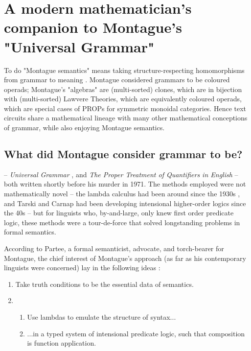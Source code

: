 \section{A modern mathematician's companion to Montague's "Universal Grammar"}\label{sec:monty}

 To do "Montague semantics" means taking structure-respecting homomorphisms from grammar to meaning \citep{janssen_montague_2021}. Montague considered grammars to be coloured operads; Montague's "algebras" are (multi-sorted) clones, which are in bijection with (multi-sorted) Lawvere Theories, which are equivalently coloured operads, which are special cases of PROPs for symmetric monoidal categories. Hence text circuits share a mathematical lineage with many other mathematical conceptions of grammar, while also enjoying Montague semantics.

\subsection{What did Montague consider grammar to be?}\label{sec:monty}

 -- \emph{Universal Grammar} \citep{montague1970universal}, and \emph{The Proper Treatment of Quantifiers in English} \citep{montague1973proper} -- both written shortly before his murder in 1971. The methods employed were not mathematically novel -- the lambda calculus had been around since the 1930s \citep{church_set_1933}, and Tarski and Carnap had been developing intensional higher-order logics since the 40s \citep{carnap_meaning_1988} -- but for linguists who, by-and-large, only knew first order predicate logic, these methods were a tour-de-force that solved longstanding problems in formal semantics.

 According to Partee, a formal semanticist, advocate, and torch-bearer for Montague, the chief interest of Montague's approach (as far as his contemporary linguists were concerned) lay in the following ideas \citep{portner_formal_2008}:

\begin{enumerate}
\item{Take truth conditions to be the essential data of semantics.}
\item{
\begin{enumerate}
\item{Use lambdas to emulate the structure of syntax...}
\item{...in a typed system of intensional predicate logic, such that composition is function application.}
\end{enumerate}}
\end{enumerate}

